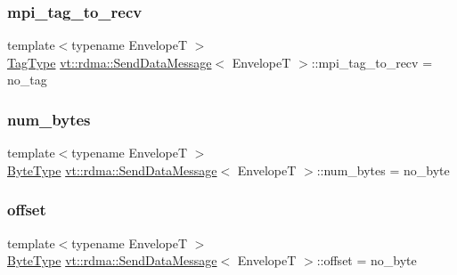 \subsubsection{\texorpdfstring{mpi\+\_\+tag\+\_\+to\+\_\+recv}{mpi\_tag\_to\_recv}}
{\footnotesize\ttfamily template$<$typename EnvelopeT $>$ \\
\hyperlink{namespacevt_a84ab281dae04a52a4b243d6bf62d0e52}{Tag\+Type} \hyperlink{structvt_1_1rdma_1_1_send_data_message}{vt\+::rdma\+::\+Send\+Data\+Message}$<$ EnvelopeT $>$\+::mpi\+\_\+tag\+\_\+to\+\_\+recv = no\+\_\+tag}

\mbox{\label{structvt_1_1rdma_1_1_send_data_message_ab8941e418cfa243cfa88b67855d3e300}} 
\subsubsection{\texorpdfstring{num\+\_\+bytes}{num\_bytes}}
{\footnotesize\ttfamily template$<$typename EnvelopeT $>$ \\
\hyperlink{namespacevt_aab8d55968084610ce3b17057981e9300}{Byte\+Type} \hyperlink{structvt_1_1rdma_1_1_send_data_message}{vt\+::rdma\+::\+Send\+Data\+Message}$<$ EnvelopeT $>$\+::num\+\_\+bytes = no\+\_\+byte}

\mbox{\label{structvt_1_1rdma_1_1_send_data_message_a5dbd859d2b95948103b770322ee85d56}} 
\subsubsection{\texorpdfstring{offset}{offset}}
{\footnotesize\ttfamily template$<$typename EnvelopeT $>$ \\
\hyperlink{namespacevt_aab8d55968084610ce3b17057981e9300}{Byte\+Type} \hyperlink{structvt_1_1rdma_1_1_send_data_message}{vt\+::rdma\+::\+Send\+Data\+Message}$<$ EnvelopeT $>$\+::offset = no\+\_\+byte}

\mbox{\label{structvt_1_1rdma_1_1_send_data_message_a202afd4750d22c74325b5709db5e025a}} 
